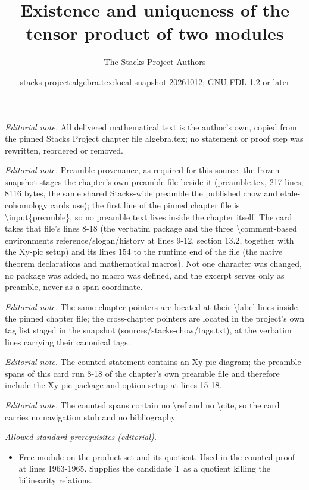 \documentclass[10pt,a4paper]{amsart}
\title{Existence and uniqueness of the tensor product of two modules}
\author{The Stacks Project Authors}
\date{stacks-project:algebra.tex:local-snapshot-20261012; GNU FDL 1.2 or later}
\theoremstyle{plain}
\theoremstyle{definition}
\theoremstyle{remark}
\numberwithin{equation}{subsection}
\begin{document}
\maketitle
\noindent\textit{Editorial note.} All delivered mathematical text is the author's own, copied from the pinned Stacks Project chapter file algebra.tex; no statement or proof step was rewritten, reordered or removed.\par\medskip
\noindent\textit{Editorial note.} Preamble provenance, as required for this source: the frozen snapshot stages the chapter's own preamble file beside it (preamble.tex, 217 lines, 8116 bytes, the same shared Stacks-wide preamble the published chow and etale-cohomology cards use); the first line of the pinned chapter file is \textbackslash{}input\{preamble\}, so no preamble text lives inside the chapter itself. The card takes that file's lines 8-18 (the verbatim package and the three \textbackslash{}comment-based environments reference/slogan/history at lines 9-12, section 13.2, together with the Xy-pic setup) and its lines 154 to the runtime end of the file (the native theorem declarations and mathematical macros). Not one character was changed, no package was added, no macro was defined, and the excerpt serves only as preamble, never as a span coordinate.\par\medskip
\noindent\textit{Editorial note.} The same-chapter pointers are located at their \textbackslash{}label lines inside the pinned chapter file; the cross-chapter pointers are located in the project's own tag list staged in the snapshot (sources/stacks-chow/tags.txt), at the verbatim lines carrying their canonical tags.\par\medskip
\noindent\textit{Editorial note.} The counted statement contains an Xy-pic diagram; the preamble spans of this card run 8-18 of the chapter's own preamble file and therefore include the Xy-pic package and option setup at lines 15-18.\par\medskip
\noindent\textit{Editorial note.} The counted spans contain no \textbackslash{}ref and no \textbackslash{}cite, so the card carries no navigation stub and no bibliography.\par\medskip
\noindent\textit{Allowed standard prerequisites (editorial).}\begin{itemize}
\item Free module on the product set and its quotient. Used in the counted proof at lines 1963-1965. Supplies the candidate T as a quotient killing the bilinearity relations.
\end{itemize}\medskip
\end{document}

